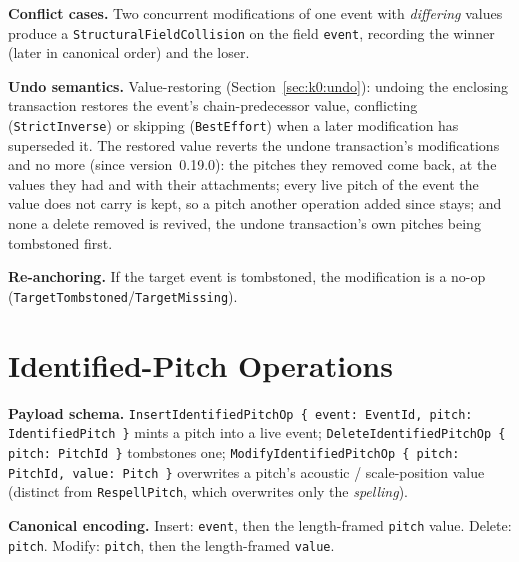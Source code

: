 \documentclass[11pt,letterpaper]{report}
\begin{document}
\textbf{Conflict cases.} Two concurrent modifications of one event with
\emph{differing} values produce a \texttt{StructuralFieldCollision} on the field
\texttt{event}, recording the winner (later in canonical order) and the loser.

\textbf{Undo semantics.} Value-restoring (Section~\ref{sec:k0:undo}): undoing
the enclosing transaction restores the event's chain-predecessor value,
conflicting (\texttt{StrictInverse}) or skipping (\texttt{BestEffort}) when a
later modification has superseded it. The restored value reverts the undone
transaction's modifications and no more (since version~0.19.0): the pitches
they removed come back, at the values they had and with their attachments;
every live pitch of the event the value does not carry is kept, so a pitch
another operation added since stays; and none a delete removed is revived, the
undone transaction's own pitches being tombstoned first.

\textbf{Re-anchoring.} If the target event is tombstoned, the modification is a
no-op (\texttt{TargetTombstoned}/\texttt{TargetMissing}).

\section{Identified-Pitch Operations}
\label{sec:k0:identified-pitch}

\textbf{Payload schema.} \texttt{InsertIdentifiedPitchOp \{ event: EventId,
pitch: IdentifiedPitch \}} mints a pitch into a live event;
\texttt{DeleteIdentifiedPitchOp \{ pitch: PitchId \}} tombstones one;
\texttt{ModifyIdentifiedPitchOp \{ pitch: PitchId, value: Pitch \}} overwrites a
pitch's acoustic / scale-position value (distinct from \texttt{RespellPitch},
which overwrites only the \emph{spelling}).

\textbf{Canonical encoding.} Insert: \texttt{event}, then the length-framed
\texttt{pitch} value. Delete: \texttt{pitch}. Modify: \texttt{pitch}, then the
length-framed \texttt{value}.
\end{document}
